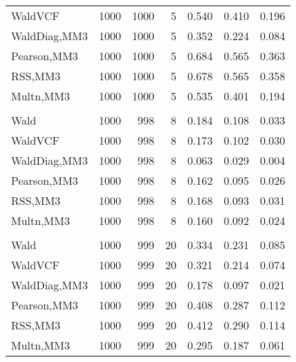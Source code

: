 \documentclass[
]{article}
\begin{document}
\begin{table}[H]
{\begin{tabular}[t]{lrrrrrr}
\hspace{1em}WaldVCF & 1000 & 1000 & 5 & 0.540 & 0.410 & 0.196\\
\hspace{1em}WaldDiag,MM3 & 1000 & 1000 & 5 & 0.352 & 0.224 & 0.084\\
\hspace{1em}Pearson,MM3 & 1000 & 1000 & 5 & 0.684 & 0.565 & 0.363\\
\hspace{1em}RSS,MM3 & 1000 & 1000 & 5 & 0.678 & 0.565 & 0.358\\
\hspace{1em}Multn,MM3 & 1000 & 1000 & 5 & 0.535 & 0.401 & 0.194\\
\addlinespace[0.3em]
\multicolumn{7}{l}{\textbf{2F 10V}}\\
\hspace{1em}Wald & 1000 & 998 & 8 & 0.184 & 0.108 & 0.033\\
\hspace{1em}WaldVCF & 1000 & 998 & 8 & 0.173 & 0.102 & 0.030\\
\hspace{1em}WaldDiag,MM3 & 1000 & 998 & 8 & 0.063 & 0.029 & 0.004\\
\hspace{1em}Pearson,MM3 & 1000 & 998 & 8 & 0.162 & 0.095 & 0.026\\
\hspace{1em}RSS,MM3 & 1000 & 998 & 8 & 0.168 & 0.093 & 0.031\\
\hspace{1em}Multn,MM3 & 1000 & 998 & 8 & 0.160 & 0.092 & 0.024\\
\addlinespace[0.3em]
\multicolumn{7}{l}{\textbf{3F 15V}}\\
\hspace{1em}Wald & 1000 & 999 & 20 & 0.334 & 0.231 & 0.085\\
\hspace{1em}WaldVCF & 1000 & 999 & 20 & 0.321 & 0.214 & 0.074\\
\hspace{1em}WaldDiag,MM3 & 1000 & 999 & 20 & 0.178 & 0.097 & 0.021\\
\hspace{1em}Pearson,MM3 & 1000 & 999 & 20 & 0.408 & 0.287 & 0.112\\
\hspace{1em}RSS,MM3 & 1000 & 999 & 20 & 0.412 & 0.290 & 0.114\\
\hspace{1em}Multn,MM3 & 1000 & 999 & 20 & 0.295 & 0.187 & 0.061\\
\bottomrule
\end{tabular}}
\endgroup{}
\end{table}
\end{document}
